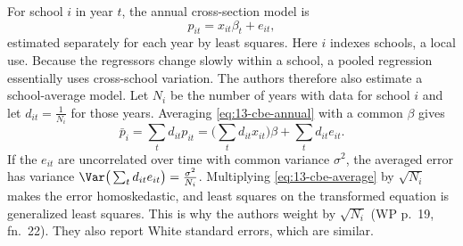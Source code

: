 For school $i$ in year $t$, the annual cross-section model is
\begin{equation}\label{eq:13-cbe-annual}
  p_{it} = x_{it}\beta_t + e_{it},
\end{equation}
estimated separately for each year by least squares. Here $i$ indexes schools, a local use. Because the regressors
change slowly within a school, a pooled regression essentially uses cross-school variation. The authors
therefore also estimate a school-average model. Let $N_i$ be the number of years with data for school $i$ and let
$d_{it} = \frac{1}{N_i}$ for those years. Averaging \eqref{eq:13-cbe-annual} with a common $\beta$ gives
\begin{equation}\label{eq:13-cbe-average}
  \bar p_i = \sum_t d_{it}p_{it} = \Big(\sum_t d_{it}x_{it}\Big)\beta + \sum_t d_{it}e_{it} .
\end{equation}
If the $e_{it}$ are uncorrelated over time with common variance $\sigma^2$, the averaged error has variance
$\Var\big(\sum_t d_{it}e_{it}\big) = \frac{\sigma^2}{N_i}$. Multiplying \eqref{eq:13-cbe-average} by
$\sqrt{N_i}$ makes the error homoskedastic, and least squares on the transformed equation is generalized least
squares. This is why the authors weight by $\sqrt{N_i}$ (WP p.~19, fn.~22). They also report White standard errors,
which are similar.

